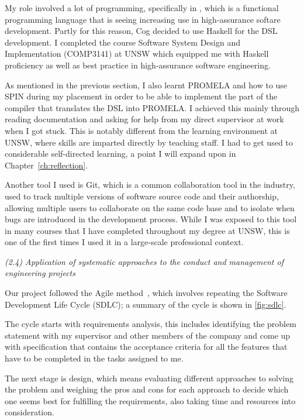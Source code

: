 \documentclass{report}
\begin{document}
My role involved a lot of programming, specifically in \citet{haskell}, which is a functional programming
language that is seeing increasing use in high-assurance softare development. Partly for this reason,
Cog decided to use Haskell for the DSL development. I completed the course 
Software System Design and Implementation (COMP3141) at UNSW which equipped me with Haskell proficiency
as well as best practice in high-assurance software engineering.

As mentioned in the previous section, I also learnt PROMELA and how to use SPIN during my placement
in order to be able to implement the part of the compiler that translates the DSL into PROMELA.
I achieved this mainly through reading documentation and asking for help from my direct supervisor
at work when I got stuck. This is notably different from the learning environment at UNSW, where 
skills are imparted directly by teaching staff. I had to get used to considerable self-directed learning,
a point I will expand upon in Chapter~\ref{ch:reflection}.

Another tool I used is Git, which is a common collaboration tool in the industry, used to track multiple versions of 
software source code and their authorship, allowing multiple users to collaborate on the same code 
base and to isolate when bugs are introduced in the development process.
While I was exposed to this tool in many courses that I have completed
throughout my degree at UNSW, this is one of the first times I used it in a large-scale professional context.

\textit{(2.4) Application of systematic approaches to the conduct and management of engineering
projects}

Our project followed the Agile method~\citep{agile}, which involves repeating the Software 
Development Life Cycle (SDLC); a summary of the cycle is shown in \autoref{fig:sdlc}. 

The cycle starts with requirements analysis, this includes identifying the 
problem statement with my supervisor and other members of the company and come up with specification
that contains the acceptance criteria for all the features that have to be completed in the tasks
assigned to me.

The next stage is design, which means evaluating different approaches to solving the problem and
weighing the pros and cons for each approach to decide which one seems best for fulfilling the
requirements, also taking time and resources into consideration.
\end{document}
